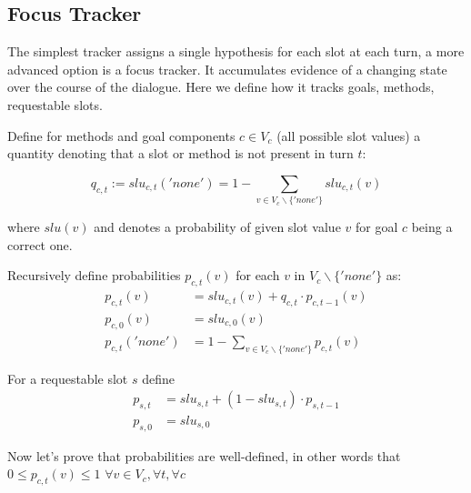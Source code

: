 \documentclass[12pt,titlepage,a4paper]{article}
\begin{document}
\subsection{Focus Tracker}

The simplest tracker assigns a single hypothesis for each slot at each turn, a more advanced option is a focus tracker. It accumulates evidence of a changing state over the course of the dialogue. Here we define how it tracks goals, methods, requestable slots. 

Define for methods and goal components $c \in V_c$ (all possible slot values) a quantity denoting that a slot or method is not present in turn $t$:

\begin{equation}
    \label{eqn:q_c_t}
    q_{c,t} := slu_{c,t}('none') = 1 - \sum_{v \in V_c \backslash \{'none'\}}slu_{c,t}(v)
\end{equation}

\noindent where $slu(v)$ and denotes a probability of given slot value $v$ for goal $c$ be\-ing a correct one. 

Recursively define probabilities $p_{c,t}(v)$ for each $v$ in $V_c \backslash \{'none'\}$ as: 
\begin{align}
    \label{eqn:p_c_t}
    p_{c,t}(v) &=slu_{c,t}(v) + q_{c,t} \cdot p_{c,t-1}(v) \\
    \label{eqn:p_c_0}
    p_{c,0}(v) &= slu_{c,0}(v) \\
    \label{eqn:p_c_t_none}
    p_{c,t}('none') &= 1 - \sum_{v \in V_c \backslash \{'none'\}}p_{c,t}(v)
\end{align}

For a requestable slot $s$ define 
\begin{align}
    \label{eqn:p_s_t}
    p_{s,t} &= slu_{s,t} + (1 - slu_{s, t})\cdot p_{s,t-1} \\
    \label{eqn:p_s_0}
    p_{s,0} &= slu_{s,0}
\end{align}

Now let's prove that probabilities are well-defined, in other words that $0 \leq p_{c,t}(v) \leq 1$ $\forall v \in V_c, \forall t, \forall c$
\end{document}
